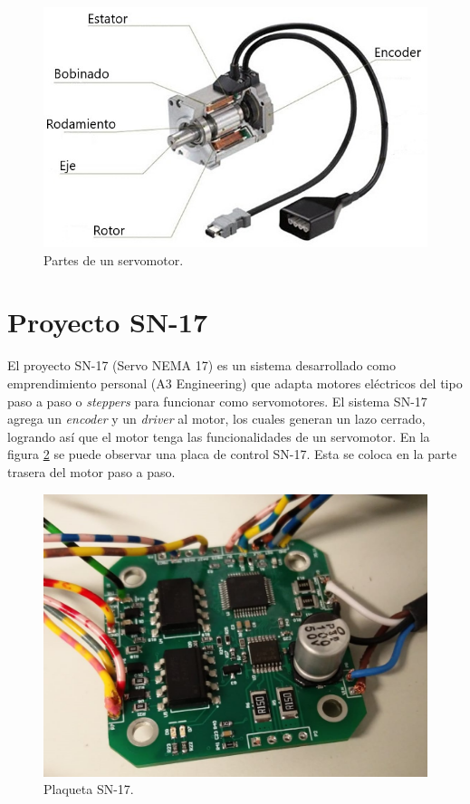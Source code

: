 \begin{figure}[htbp]
	\centering
	\includegraphics[scale=0.8]{./Figures/servomotor.jpg}
	\caption{Partes de un servomotor\protect\footnotemark .}
	\label{fig:servomotor}
\end{figure}



\section{Proyecto SN-17}

El proyecto SN-17 (Servo NEMA 17) es un sistema desarrollado como emprendimiento personal (A3 Engineering) que adapta motores eléctricos del tipo paso a paso o \textit{steppers} para funcionar como servomotores. El sistema SN-17 agrega un \textit{encoder} y un \textit{driver} al motor, los cuales generan un lazo cerrado, logrando así que el motor tenga las funcionalidades de un servomotor. En la figura \ref{fig:SN17} se puede observar una placa de control SN-17. Esta se coloca en la parte trasera del motor paso a paso.

\begin{figure}[htbp]
	\centering
	\includegraphics[scale=.3]{./Figures/SN17_5.jpeg}
	\caption{Plaqueta SN-17.}
	\label{fig:SN17}
\end{figure}

